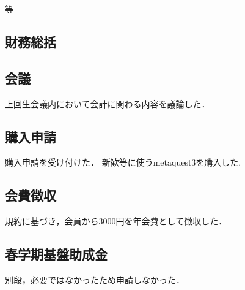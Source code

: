 等\subsection*{財務総括}


\subsection*{会議}
上回生会議内において会計に関わる内容を議論した．

\subsection*{購入申請}
購入申請を受け付けた．
新歓等に使うmetaquest3を購入した.

\subsection*{会費徴収}
規約に基づき，会員から3000円を年会費として徴収した．

\subsection*{春学期基盤助成金}
別段，必要ではなかったため申請しなかった．

